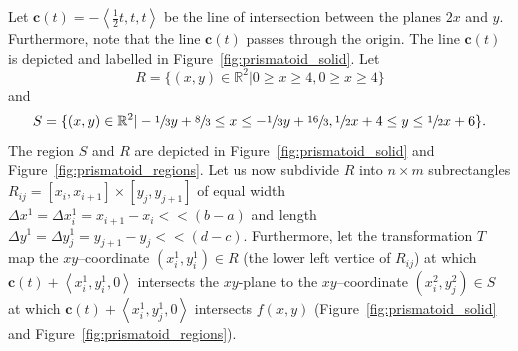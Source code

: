 \documentclass{article}
\theoremstyle{theorem}
\theoremstyle{definition}
\begin{document}
Let $\mathbf{c}(t) = -\left<\frac{1}{2}t,t,t\right>$ be the line of intersection between the planes $2x$ and $y$. Furthermore, note that the line 
$\mathbf{c}(t)$ passes through the origin. The line $\mathbf{c}(t)$ is depicted and labelled in Figure~\ref{fig:prismatoid_solid}. Let 
\begin{equation}
R = \{(x,y)\in\mathbb{R}^2|0 \geq x \geq 4, 0 \geq x \geq 4\} \nonumber
\end{equation}
and
\begin{equation}
S = \{(x,y)\in\mathbb{R}^2|-\sfrac{1}{3}y+\sfrac{8}{3}\leq x\leq -\sfrac{1}{3}y+\sfrac{16}{3}, \sfrac{1}{2} x + 4\leq y \leq \sfrac{1}{2} x + 6 \}. \nonumber
\end{equation}
The region $S$ and $R$ are depicted in Figure~\ref{fig:prismatoid_solid} and Figure~\ref{fig:prismatoid_regions}. Let us now subdivide $R$ into $n\times m$
subrectangles $R_{ij} = [x_{i},x_{i+1}] \times [y_{j},y_{j+1}]$ of equal width $\Delta x^1 = \Delta x_i^1 = x_{i+1}-x_i<<(b-a)$ and length $\Delta y^1= \Delta y_j^1 = y_{j+1}-y_j<<(d-c)$. 
Furthermore, let the transformation $T$ map the $xy$--coordinate $(x_i^1,y_i^1)\in R$ (the lower left vertice of $R_{ij}$) at which $\mathbf{c}(t) + \left <x_i^1,y_i^1,0 \right >$ intersects the 
$xy$-plane to the $xy$--coordinate $(x_i^2,y_j^2)\in S$ at which $\mathbf{c}(t) + \left <x_i^1,y_j^1,0 \right >$ intersects $f(x,y)$ (Figure~\ref{fig:prismatoid_solid} and Figure~\ref{fig:prismatoid_regions}). 

\end{document}

